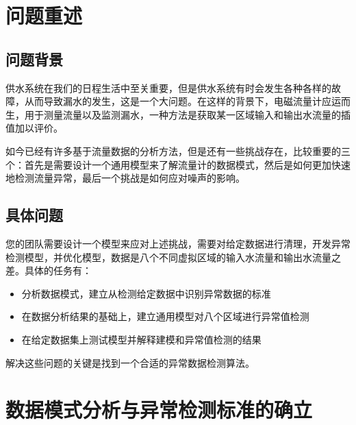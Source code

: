 \documentclass[UTF8]{article}
\begin{document}
	\section{问题重述}
		\subsection{问题背景}
		\par 供水系统在我们的日程生活中至关重要，但是供水系统有时会发生各种各样的故障，从而导致漏水的发生，这是一个大问题。在这样的背景下，电磁流量计应运而生，用于测量流量以及监测漏水，一种方法是获取某一区域输入和输出水流量的插值加以评价。 
		\par 如今已经有许多基于流量数据的分析方法，但是还有一些挑战存在，比较重要的三个：首先是需要设计一个通用模型来了解流量计的数据模式，然后是如何更加快速地检测流量异常，最后一个挑战是如何应对噪声的影响。\cite[C1]{znswxxh}
		\subsection{具体问题}
		\par 您的团队需要设计一个模型来应对上述挑战，需要对给定数据进行清理，开发异常检测模型，并优化模型，数据是八个不同虚拟区域的输入水流量和输出水流量之差。具体的任务有：

		\begin{itemize}
			\item 分析数据模式，建立从检测给定数据中识别异常数据的标准
			\item 在数据分析结果的基础上，建立通用模型对八个区域进行异常值检测
			\item 在给定数据集上测试模型并解释建模和异常值检测的结果
		\end{itemize}
		解决这些问题的关键是找到一个合适的异常数据检测算法。
	\section{数据模式分析与异常检测标准的确立}	
\end{document}
